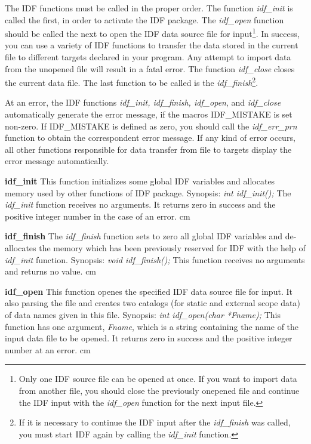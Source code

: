 The IDF functions must be called in the proper order.
The function {\it idf\_init} is called the first,
in order to activate the IDF package.
The {\it idf\_open} function should be called the next
to open the IDF data source file for input\footnote{
Only one IDF source file can be opened at once.
If you want to import data from another file,
you should close the previously onepened file and
continue the IDF input with the {\it idf\_open} function 
for the next input file. 
}.
In success, you can use a variety of IDF functions
to transfer the data stored in the current file
to different targets declared in your program.
Any attempt to import data from the unopened file
will result in a fatal error.
The function {\it idf\_close} closes the current data file.
The last function to be called is the {\it idf\_finish}\footnote{
If it is necessary to continue the IDF input after the {\it idf\_finish}
was called,
you must start IDF again by calling the {\it idf\_init} function.
}.

At an error, the IDF functions {\it idf\_init, idf\_finish,
idf\_open}, and {\it idf\_close}
automatically  generate the  error message,
if the macros IDF\_MISTAKE  is set non-zero.
If IDF\_MISTAKE  is defined as zero,
you should call the {\it idf\_err\_prn} function
to obtain the correspondent error message.
If any kind of error occurs,
all other functions responsible for data transfer from file to targets
display the error message automatically.


{
{\bf idf\_init}\hfil\break
This function initializes some global IDF variables
and allocates memory used by other functions of IDF package.
Synopsis:\hfil\break
{\it int idf\_init();}\hfil\break
The {\it idf\_init} function receives no arguments. 
It returns zero in success
and the positive integer number in the case of an error.
}
 cm

{
{\bf idf\_finish}\hfil\break
The {\it idf\_finish} function sets to zero all global IDF variables and
de-allocates the memory which has been previously reserved for IDF
with the help of {\it idf\_init} function.
Synopsis:\hfil\break
{\it void idf\_finish();}\hfil\break
This function receives no arguments and returns no value. 
}
 cm

{
{\bf idf\_open}\hfil\break
This function openes the specified IDF data source file for input.
It also parsing the file and creates two catalogs (for static
and external scope data) of data names given in this file.
Synopsis:\hfil\break
{\it int idf\_open(char *Fname);}\hfil\break
This function has one argument, {\it Fname}, which is a string
containing the name of the input data file to be opened. 
It returns zero in success
and the positive integer number at an error.
}
 cm

